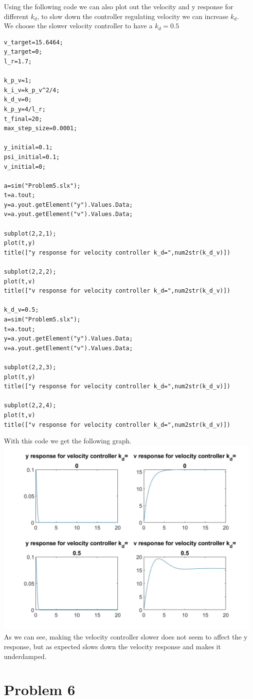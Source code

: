 \documentclass[12pt]{article}
\begin{document}
Using the following code we can also plot out the velocity and y response for different $k_d$, to slow down the controller
regulating velocity we can increase $k_d$. We choose the slower velocity controller to have a $k_d=0.5$
\begin{verbatim}
v_target=15.6464;
y_target=0;
l_r=1.7;

k_p_v=1;
k_i_v=k_p_v^2/4;
k_d_v=0;
k_p_y=4/l_r;
t_final=20;
max_step_size=0.0001;

y_initial=0.1;
psi_initial=0.1;
v_initial=0;

a=sim("Problem5.slx");
t=a.tout;
y=a.yout.getElement("y").Values.Data;
v=a.yout.getElement("v").Values.Data;

subplot(2,2,1); 
plot(t,y)
title(["y response for velocity controller k_d=",num2str(k_d_v)])

subplot(2,2,2); 
plot(t,v)
title(["v response for velocity controller k_d=",num2str(k_d_v)])

k_d_v=0.5;
a=sim("Problem5.slx");
t=a.tout;
y=a.yout.getElement("y").Values.Data;
v=a.yout.getElement("v").Values.Data;

subplot(2,2,3); 
plot(t,y)
title(["y response for velocity controller k_d=",num2str(k_d_v)])

subplot(2,2,4); 
plot(t,v)
title(["v response for velocity controller k_d=",num2str(k_d_v)])
\end{verbatim}
With this code we get the following graph.\\
\includegraphics[scale=0.3]{Problem5Fig4.jpg}\\
As we can see, making the velocity controller slower does not seem to affect the y response, but as expected slows down the velocity response
and makes it underdamped.
\section*{Problem 6}
\end{document}
